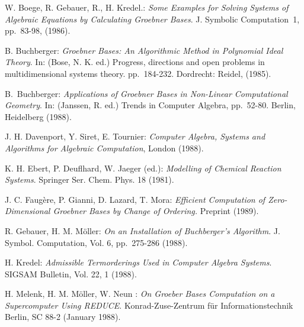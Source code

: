 \newpage
\begin{thebibliography}{99}
 W. Boege, R. Gebauer, R., H. Kredel.: {\it Some
Examples for Solving Systems of Algebraic Equations by Calculating
Groebner Bases}.  J. Symbolic Computation~1, pp.~83-98, (1986).

 B. Buchberger: {\it  Groebner Bases:  An
Algorithmic Method in Polynomial Ideal Theory}. In: (Bose, N. K. ed.)
Progress, directions and open problems in multidimensional
systems theory. pp.~184-232.  Dordrecht: Reidel, (1985).

 B.~Buchberger: {\it Applications of Groebner
Bases in Non-Linear Computational Geometry}. In: (Janssen, R. ed.)
Trends in Computer Algebra, pp.~52-80. Berlin,
Heidelberg (1988).

 J. H. Davenport,  Y. Siret, E. Tournier: {\it
Computer Algebra, Systems and Algorithms for Algebraic
Computation}, London (1988).

 K. H. Ebert,  P. Deuflhard, W. Jaeger (ed.): {\it
Modelling of Chemical Reaction Systems}. Springer Ser. Chem. Phys.
18 (1981).

 J. C. Faug{\`e}re, P. Gianni, D. Lazard, T. Mora: {\it
Efficient Computation of Zero-Dimensional Groebner Bases by Change
of Ordering.} Preprint (1989).

 R. Gebauer,  H. M.  M\"oller: {\it On an
Installation of Buchberger's Algorithm}. J. Symbol.
Computation, Vol. 6, pp.~275-286 (1988).

 H. Kredel: {\it Admissible Termorderings Used in
Computer Algebra Systems}. SIGSAM Bulletin, Vol. 22, 1 (1988).

 H. Melenk,  H. M. M\"oller,  W. Neun : {\it On
Groeber Bases Computation on a Supercomputer Using REDUCE}.
Konrad-Zuse-Zentrum f\"ur Infor\-ma\-tions\-technik Berlin, SC
88-2 (January 1988).

\end{thebibliography}


